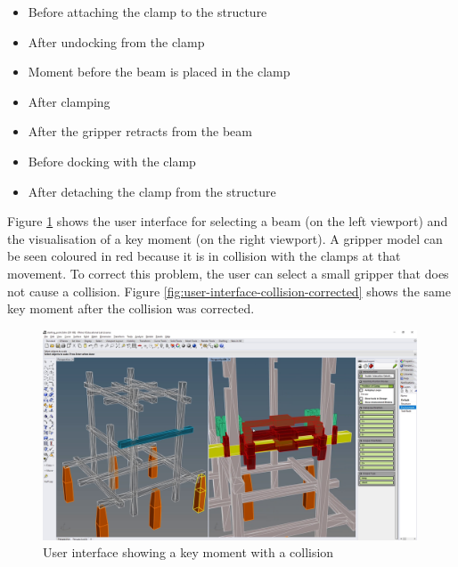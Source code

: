 \begin{itemize}[nosep]
    \item Before attaching the clamp to the structure
    \item After undocking from the clamp
    \item Moment before the beam is placed in the clamp
    \item After clamping
    \item After the gripper retracts from the beam
    \item Before docking with the clamp
    \item After detaching the clamp from the structure
\end{itemize}


Figure \ref{fig:user-interface-collision} shows the user interface for selecting a beam (on the left viewport) and the visualisation of a key moment (on the right viewport). A gripper model can be seen coloured in red because it is in collision with the clamps at that movement. 
To correct this problem, the user can select a small gripper that does not cause a collision. Figure \ref{fig:user-interface-collision-corrected} shows the same key moment after the collision was corrected.


\begin{figure}[!h]
    \centering
    \includegraphics[width=0.99\textwidth]{images/05/image19.png}
    \caption{User interface showing a key moment with a collision}
    \label{fig:user-interface-collision}
\end{figure}

